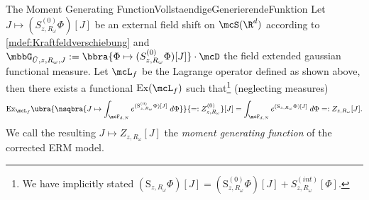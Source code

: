 \begin{mpos}{The Moment Generating Function}{VollstaendigeGenerierendeFunktion}
    Let $J\mapsto (S_{z,R_\omega}^{(0)}\Phi)[J]$ be an external field shift on $\mcS(\R^d)$ according to \ref{mdef:Kraftfeldverschiebung} and $\mbbG_{\tilde U,z,R_\omega,J}:=\bbra{\Phi\mapsto (S_{z,R_\omega}^{(0)}\Phi)[J]}\cdot\mcD$ the field extended gaussian functional measure. Let $\mcL_f$ be the Lagrange operator defined as shown above, then there exists a functional $\text{Ex}(\mcL_f)$ such that\footnote{We have implicitly stated $(\text{S}_{z,R_\omega}\Phi)[J] = (\text{S}_{z,R_\omega}^{(0)}\Phi)[J] + S_{z,R_\omega}^{(\textit{int})}[\Phi]$.} (neglecting measures)
    \[
        \text{Ex}_{\mcL_f}\ubra{\nsqbra{J\mapsto \int_{\mcF_{d,N}} e^{(\text{S}_{z,R_\omega}^{(0)}\Phi)[J]}\;d\Phi}}{=:Z_{z,R_\omega}^{(0)}}[J] = \int_{\mcF_{d,N}} e^{(\text{S}_{z,R_\omega}\Phi)[J]}\;d\Phi =: Z_{z,R_\omega}[J].
    \]
    We call the resulting $J\mapsto Z_{z,R_\omega}[J]$ the \emph{moment generating function} of the corrected ERM model.
\end{mpos}